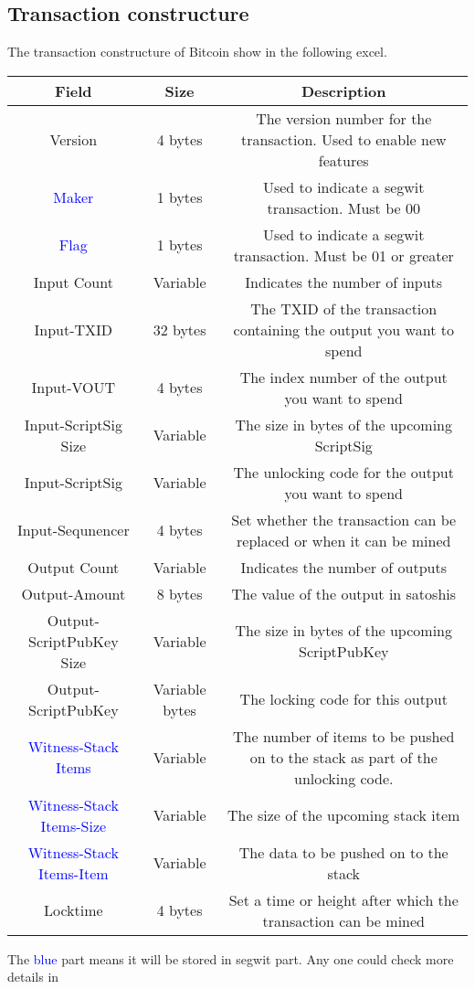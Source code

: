 \subsection{Transaction constructure}

The transaction constructure of Bitcoin show in the following excel.

\begin{tabular}{|c|c|c|} \hline
    Field & Size & Description \\ \hline
    Version & 4 bytes & The version number for the transaction. Used to enable new features  \\ \hline
    \textcolor{blue}{Maker} & 1 bytes & Used to indicate a segwit transaction. Must be 00 \\ \hline
    \textcolor{blue}{Flag} & 1 bytes & Used to indicate a segwit transaction. Must be 01 or greater  \\ \hline
    Input Count & Variable & Indicates the number of inputs  \\ \hline
    Input-TXID & 32 bytes & The TXID of the transaction containing the output you want to spend  \\ \hline
    Input-VOUT & 4 bytes & The index number of the output you want to spend  \\ \hline
    Input-ScriptSig Size & Variable & The size in bytes of the upcoming ScriptSig  \\ \hline
    Input-ScriptSig & Variable & The unlocking code for the output you want to spend  \\ \hline
    Input-Sequnencer & 4 bytes & Set whether the transaction can be replaced or when it can be mined  \\ \hline
    Output Count & Variable & Indicates the number of outputs  \\ \hline
    Output-Amount & 8 bytes & The value of the output in satoshis  \\ \hline
    Output-ScriptPubKey Size & Variable & The size in bytes of the upcoming ScriptPubKey  \\ \hline
    Output-ScriptPubKey & Variable bytes & The locking code for this output  \\ \hline
    \textcolor{blue}{Witness-Stack Items} & Variable & The number of items to be pushed on to the stack as part of the unlocking code.  \\ \hline
    \textcolor{blue}{Witness-Stack Items-Size} & Variable & The size of the upcoming stack item  \\ \hline
    \textcolor{blue}{Witness-Stack Items-Item} & Variable & The data to be pushed on to the stack  \\ \hline
    Locktime & 4 bytes & Set a time or height after which the transaction can be mined  \\ \hline
\end{tabular}

The \textcolor{blue}{blue} part means it will be stored in segwit part. Any one could check more details in \cite{website:transaction-constructure}